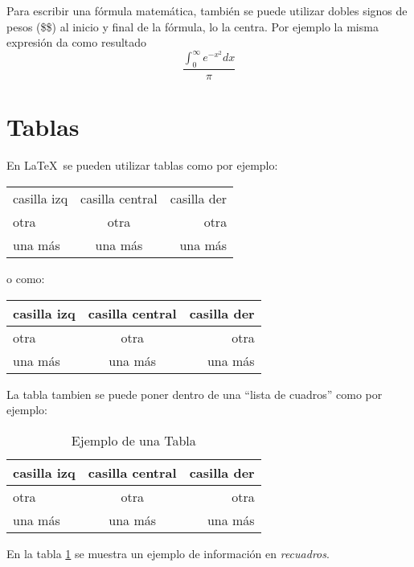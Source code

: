 \documentclass[12pt]{article}
\begin{document}
Para escribir una f\'ormula matem\'atica, tambi\'en se puede utilizar
dobles signos de pesos (\$\$) al inicio y final de la f\'ormula, lo la
centra. Por ejemplo la misma expresi\'on da como resultado
$$\frac{\int_0^\infty e^{-x^2}dx}{\pi}$$

\section{Tablas}

En \LaTeX\ se pueden utilizar tablas como por ejemplo:

\begin{center}

\begin{tabular}{lcr}

casilla izq & casilla central & casilla der \\
otra & otra & otra \\
una m\'as & una m\'as & una m\'as 

\end{tabular}

\end{center}

o como:

\begin{center}

\begin{tabular}{||l|c|r||}

\hline
casilla izq & casilla central & casilla der \\ \hline
otra & otra & otra \\ \hline
una m\'as & una m\'as & una m\'as \\ \hline

\end{tabular}

\end{center}

La tabla tambien se puede poner dentro de una ``lista de cuadros''
como por ejemplo:

\begin{table}

\begin{tabular}{||l|c|r||}

\hline
casilla izq & casilla central & casilla der \\ \hline
otra & otra & otra \\ \hline
una m\'as & una m\'as & una m\'as \\ \hline

\end{tabular}

\caption{Ejemplo de una Tabla}\label{miTabla}

\end{table}

En la tabla \ref{miTabla} se muestra un ejemplo de informaci\'on en
\emph{recuadros}.
\end{document}

